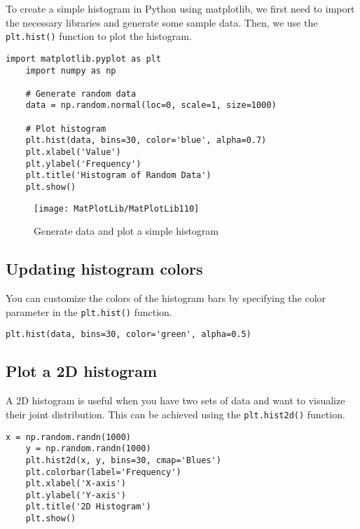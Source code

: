 To create a simple histogram in Python using matplotlib, we first need to import the necessary libraries and generate some sample data. Then, we use the \lstinline{plt.hist()} function to plot the histogram.

\begin{lstlisting}[caption={Generate data and plot a simple histogram}, label={lst:simple_histogram}]
	import matplotlib.pyplot as plt
	import numpy as np
	
	# Generate random data
	data = np.random.normal(loc=0, scale=1, size=1000)
	
	# Plot histogram
	plt.hist(data, bins=30, color='blue', alpha=0.7)
	plt.xlabel('Value')
	plt.ylabel('Frequency')
	plt.title('Histogram of Random Data')
	plt.show()
\end{lstlisting}

\begin{figure}[h]
	\centering
	\texttt{[image: MatPlotLib/MatPlotLib110]}
	\caption{Generate data and plot a simple histogram}\label{Matplotlib110}
\end{figure}

\subsection*{Updating histogram colors}

You can customize the colors of the histogram bars by specifying the color parameter in the \lstinline{plt.hist()} function.

\begin{lstlisting}[caption={Updating histogram colors}, label={lst:histogram_colors}]
	plt.hist(data, bins=30, color='green', alpha=0.5)
\end{lstlisting}

\subsection*{Plot a 2D histogram}

A 2D histogram is useful when you have two sets of data and want to visualize their joint distribution. This can be achieved using the \lstinline{plt.hist2d()} function.

\begin{lstlisting}[caption={Plot a 2D histogram}, label={lst:2d_histogram}]
	x = np.random.randn(1000)
	y = np.random.randn(1000)
	plt.hist2d(x, y, bins=30, cmap='Blues')
	plt.colorbar(label='Frequency')
	plt.xlabel('X-axis')
	plt.ylabel('Y-axis')
	plt.title('2D Histogram')
	plt.show()
\end{lstlisting}

